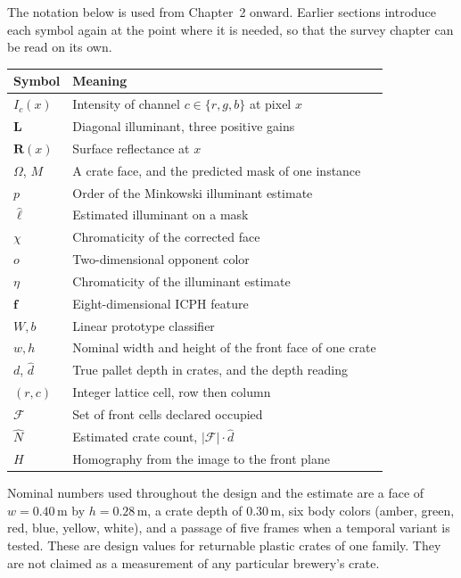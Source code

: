 \documentclass[12pt,a4paper]{report}
\begin{document}
The notation below is used from Chapter~2 onward. Earlier sections introduce each symbol again at the point where it is needed, so that the survey chapter can be read on its own.

\begin{center}
\begin{tabular}{@{}ll@{}}
\toprule
Symbol & Meaning \\
\midrule
$I_c(x)$ & Intensity of channel $c\in\{r,g,b\}$ at pixel $x$ \\
$\mathbf{L}$ & Diagonal illuminant, three positive gains \\
$\mathbf{R}(x)$ & Surface reflectance at $x$ \\
$\Omega$, $M$ & A crate face, and the predicted mask of one instance \\
$p$ & Order of the Minkowski illuminant estimate \\
$\hat{\ell}$ & Estimated illuminant on a mask \\
$\chi$ & Chromaticity of the corrected face \\
$o$ & Two-dimensional opponent color \\
$\eta$ & Chromaticity of the illuminant estimate \\
$\mathbf{f}$ & Eight-dimensional ICPH feature \\
$W,b$ & Linear prototype classifier \\
$w,h$ & Nominal width and height of the front face of one crate \\
$d$, $\hat{d}$ & True pallet depth in crates, and the depth reading \\
$(r,c)$ & Integer lattice cell, row then column \\
$\mathcal{F}$ & Set of front cells declared occupied \\
$\hat{N}$ & Estimated crate count, $\lvert\mathcal{F}\rvert\cdot\hat{d}$ \\
$H$ & Homography from the image to the front plane \\
\bottomrule
\end{tabular}
\end{center}

\vspace{0.6em}
\noindent
Nominal numbers used throughout the design and the estimate are a face of $w=0.40\,\mathrm{m}$ by $h=0.28\,\mathrm{m}$, a crate depth of $0.30\,\mathrm{m}$, six body colors (amber, green, red, blue, yellow, white), and a passage of five frames when a temporal variant is tested. These are design values for returnable plastic crates of one family. They are not claimed as a measurement of any particular brewery's crate.

\cleardoublepage
{}







\end{document}
